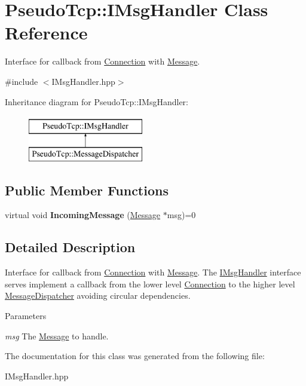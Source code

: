 \hypertarget{classPseudoTcp_1_1IMsgHandler}{
\section{PseudoTcp::IMsgHandler Class Reference}
\label{classPseudoTcp_1_1IMsgHandler}
}


Interface for callback from \hyperlink{classPseudoTcp_1_1Connection}{Connection} with \hyperlink{classPseudoTcp_1_1Message}{Message}.  




{\ttfamily \#include $<$IMsgHandler.hpp$>$}

Inheritance diagram for PseudoTcp::IMsgHandler:\begin{figure}[H]
\begin{center}
\leavevmode
\includegraphics[height=2cm]{classPseudoTcp_1_1IMsgHandler}
\end{center}
\end{figure}
\subsection*{Public Member Functions}
\begin{DoxyCompactItemize}
\item 
\hypertarget{classPseudoTcp_1_1IMsgHandler_a489ae29ae542515d53a21eaac9af03c0}{
virtual void {\bfseries IncomingMessage} (\hyperlink{classPseudoTcp_1_1Message}{Message} $\ast$msg)=0}
\label{classPseudoTcp_1_1IMsgHandler_a489ae29ae542515d53a21eaac9af03c0}

\end{DoxyCompactItemize}


\subsection{Detailed Description}
Interface for callback from \hyperlink{classPseudoTcp_1_1Connection}{Connection} with \hyperlink{classPseudoTcp_1_1Message}{Message}. The \hyperlink{classPseudoTcp_1_1IMsgHandler}{IMsgHandler} interface serves implement a callback from the lower level \hyperlink{classPseudoTcp_1_1Connection}{Connection} to the higher level \hyperlink{classPseudoTcp_1_1MessageDispatcher}{MessageDispatcher} avoiding circular dependencies. 
\begin{DoxyParams}{Parameters}
\item[{\em msg}]The \hyperlink{classPseudoTcp_1_1Message}{Message} to handle. \end{DoxyParams}


The documentation for this class was generated from the following file:\begin{DoxyCompactItemize}
\item 
IMsgHandler.hpp\end{DoxyCompactItemize}
